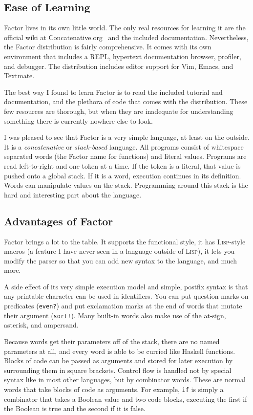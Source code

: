 \documentclass{article}
\begin{document}
\subsection{Ease of Learning}

Factor lives in its own little world.  The only real resources for learning it
are the official wiki at Concatenative.org~\cite{factorwiki} and the
included documentation.  Nevertheless, the Factor distribution is fairly
comprehensive.  It comes with its own environment that includes a REPL,
hypertext documentation browser, profiler, and debugger.  The distribution
includes editor support for Vim, Emacs, and Textmate.  

The best way I found to learn Factor is to read the included tutorial and
documentation, and the plethora of code that comes with the distribution.  These
few resources are thorough, but when they are inadequate for understanding
something there is currently nowhere else to look.

I was pleased to see that Factor is a very simple language, at least on the
outside.  It is a \emph{concatenative} or \emph{stack-based} language.  All
programs consist of whitespace separated words (the Factor name for functions)
and literal values.  Programs are read left-to-right and one token at a time.
If the token is a literal, that value is pushed onto a global stack.  If it is a
word, execution continues in its definition.  Words can manipulate values on the
stack.  Programming around this stack is the hard and interesting part about the
language.

\subsection{Advantages of Factor}

Factor brings a lot to the table.  It supports the functional style, it has
\textsc{Lisp}-style macros (a feature I have never seen in a language outside of
\textsc{Lisp}), it lets you modify the parser so that you can add new syntax to
the language, and much more.

A side effect of its very simple execution model and simple, postfix syntax is
that any printable character can be used in identifiers.  You can put question
marks on predicates (\texttt{even?}) and put exclamation marks at the end of
words that mutate their argument (\texttt{sort!}).  Many built-in words also
make use of the at-sign, asterisk, and ampersand.

Because words get their parameters off of the stack, there are no named
parameters at all, and every word is able to be curried like Haskell functions.
Blocks of code can be passed as arguments and stored for later execution
by surrounding them in square brackets.  Control flow is handled not by special
syntax like in most other languages, but by combinator words.  These are normal
words that take blocks of code as arguments.  For example, \texttt{if} is simply
a combinator that takes a Boolean value and two code blocks, executing the first
if the Boolean is true and the second if it is false.
\end{document}
